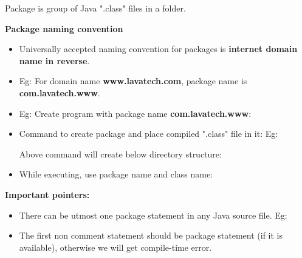 \setlength{\columnsep}{3pt}
\begin{flushleft}

	Package is group of Java ".class" files in a folder.

	\textbf{Package naming convention}
	\begin{itemize}
		\item Universally accepted naming convention for packages is \textbf{internet domain name in reverse}.
		\item Eg: For domain name \textbf{www.lavatech.com}, package name is \textbf{com.lavatech.www}.
		\item Eg: Create program with package name \textbf{com.lavatech.www}:
		\item Command to create package and place compiled ".class" file in it:
		\bigskip
		Eg:
		
		Above command will create below directory structure:
		
		\item While executing, use package name and class name:
		\bigskip
		
	\end{itemize}


\textbf{Important pointers:}
\begin{itemize}
	\item There can be utmost one package statement in any Java source file.
	\newline
	Eg:
	\bigskip
	\item The first non comment statement should be package statement (if it is available), otherwise we will get compile-time error.
	\bigskip
	

\end{itemize}
\end{flushleft}
